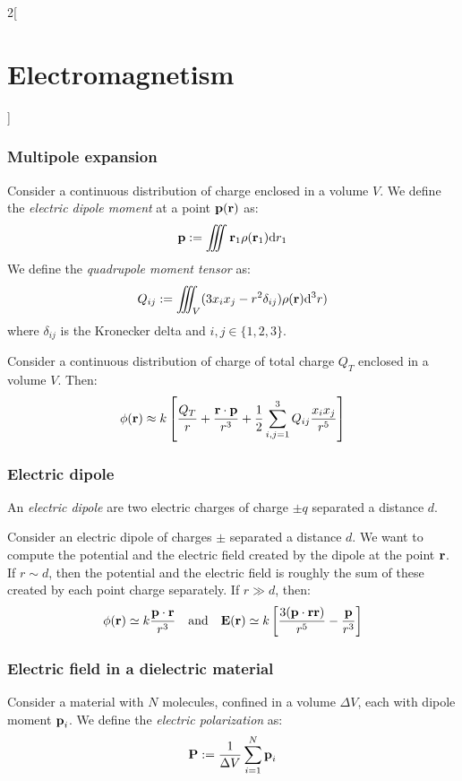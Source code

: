 \documentclass[../../../main.tex]{subfiles}
\begin{document}
\begin{multicols}{2}[\section{Electromagnetism}]
  \subsubsection{Multipole expansion}
  \begin{definition}
    Consider a continuous distribution of charge enclosed in a volume $V$. We define the \emph{electric dipole moment} at a point $\boldsymbol{\mathrm{p}}(\boldsymbol{\mathrm{r}})$ as: $$\boldsymbol{\mathrm{p}}:=\iiint\boldsymbol{\mathrm{r}}_1\rho(\boldsymbol{\mathrm{r}}_1)\dd r_1$$
    We define the \emph{quadrupole moment tensor} as: $$Q_{ij}:=\iiint_V(3x_ix_j-r^2\delta_{ij})\rho(\boldsymbol{\mathrm{r}})\dd^3 r)$$ where $\delta_{ij}$ is the Kronecker delta and $i,j\in\{1,2,3\}$.
  \end{definition}
  \begin{prop}
    Consider a continuous distribution of charge of total charge $Q_T$ enclosed in a volume $V$. Then:
    $$\phi(\boldsymbol{\mathrm{r}})\approx k\left[\frac{Q_T}{r}+\frac{\boldsymbol{\mathrm{r}}\cdot\boldsymbol{\mathrm{p}}}{r^3}+\frac{1}{2}\sum_{i,j=1}^3Q_{ij}\frac{x_ix_j}{r^5}\right]$$
  \end{prop}
  \subsubsection{Electric dipole}
  \begin{definition}
    An \emph{electric dipole} are two electric charges of charge $\pm q$ separated a distance $d$.
  \end{definition}
  \begin{prop}
    Consider an electric dipole of charges $\pm$ separated a distance $d$. We want to compute the potential and the electric field created by the dipole at the point $\boldsymbol{\mathrm{r}}$. If $r\sim d$, then the potential and the electric field is roughly the sum of these created by each point charge separately. If $r\gg d$, then:
    $$\phi(\boldsymbol{\mathrm{r}})\simeq k\frac{\boldsymbol{\mathrm{p}}\cdot \boldsymbol{\mathrm{r}}}{r^3}\quad\text{and}\quad \boldsymbol{\mathrm{E}}(\boldsymbol{\mathrm{r}})\simeq k\left[\frac{3(\boldsymbol{\mathrm{p}}\cdot \boldsymbol{\mathrm{r}}\boldsymbol{\mathrm{r}})}{r^5}-\frac{\boldsymbol{\mathrm{p}}}{r^3}\right]$$
  \end{prop}
  \subsubsection{Electric field in a dielectric material}
  \begin{definition}
    Consider a material with $N$ molecules, confined in a volume $\Delta V$, each with dipole moment $\boldsymbol{\mathrm{p}}_i$. We define the \emph{electric polarization} as: $$\boldsymbol{\mathrm{P}}:=\frac{1}{\Delta V}\sum_{i=1}^N\boldsymbol{\mathrm{p}}_i$$
  \end{definition}
\end{multicols}
\end{document}
